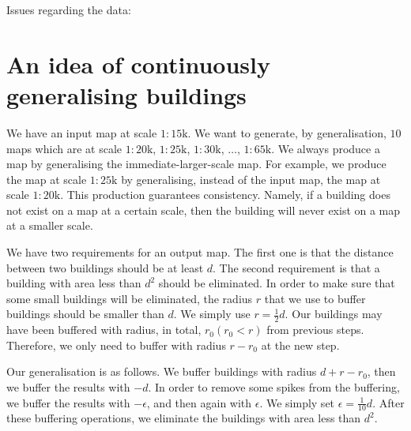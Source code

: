 \documentclass[graybox]{svmult}
\begin{document}
Issues regarding the data:

%



\section{An idea of continuously generalising buildings}
We have an input map at scale $1:15 \mathrm{k}$.
We want to generate, by generalisation, $10$ maps which are at 
scale $1:20\mathrm{k}$, $1:25\mathrm{k}$, 
$1:30\mathrm{k}$, $\dots$, $1:65\mathrm{k}$.
We always produce a map by generalising the 
immediate-larger-scale map. For example, we produce the map at 
scale $1:25\mathrm{k}$ by generalising, instead of the input 
map, the map at scale $1:20\mathrm{k}$.
This production 
guarantees consistency. Namely, if a building does not exist on 
a map at a certain scale, then the building will never exist on 
a map at a smaller scale.

We have two requirements for an output map.
The first one is that the distance between two 
buildings should be at least $d$.
The second requirement is that a building with area less than 
$d^2$ should be eliminated.
In order to make sure that some small buildings will be 
eliminated, the radius $r$ that we use to buffer buildings 
should be smaller than $d$. We simply use $r=\frac{1}{2}d$.
Our buildings may have been buffered with radius, in total, $r_0 
(r_0 < r)$ from previous steps.
Therefore, we only need to buffer with radius $r-r_0$ at the new 
step.

Our generalisation is as follows. We buffer buildings with 
radius $d+r-r_0$, then we buffer the results with $-d$. In order 
to 
remove some spikes from the buffering, we buffer the results 
with $-\epsilon$, and then again with $\epsilon$. We simply set 
$\epsilon=\frac{1}{10}d$. After these buffering operations, we 
eliminate the buildings with area less than $d^2$.
\end{document}
